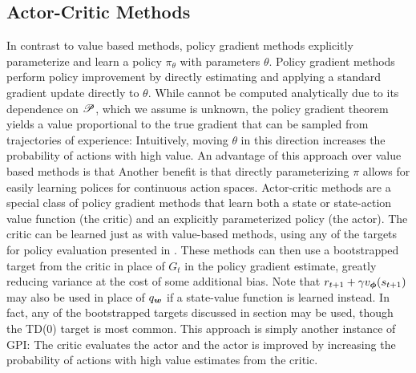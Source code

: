 \subsection{Actor-Critic Methods} 
In contrast to value based methods, policy gradient methods explicitly parameterize and learn a policy $\pi_\theta$ with parameters $\theta$. Policy gradient methods perform policy improvement by directly estimating %
and applying a standard gradient update directly to $\theta$. While %
cannot be computed analytically due to its dependence on $\mathscr{P}$, which we assume is unknown, the policy gradient theorem  yields a value proportional to the true gradient that can be sampled from trajectories of experience:
Intuitively, moving $\theta$ in this direction increases the probability of actions with high value. An advantage of this approach over value based methods is that %
Another benefit is that directly parameterizing $\pi$ allows for easily learning polices for continuous action spaces. 
Actor-critic methods are a special class of policy gradient methods that learn both a state or state-action value function (the critic) and an explicitly parameterized policy (the actor). The critic can be learned just as with value-based methods, using any of the targets for policy evaluation presented in . These methods can then use a bootstrapped target from the critic in place of $G_t$ in the policy gradient estimate, greatly reducing variance at the cost of some additional bias. 
Note that $r_{t+1} + \gamma v_{\bm \phi}(s_{t+1})$ may also be used in place of $q_{\bm w}$ if a state-value function is learned instead. In fact, any of the bootstrapped targets discussed in section  may be used, though the TD(0) target is most common. This approach is simply another instance of GPI: The critic evaluates the actor and the actor is improved by increasing the probability of actions with high value estimates from the critic. 

